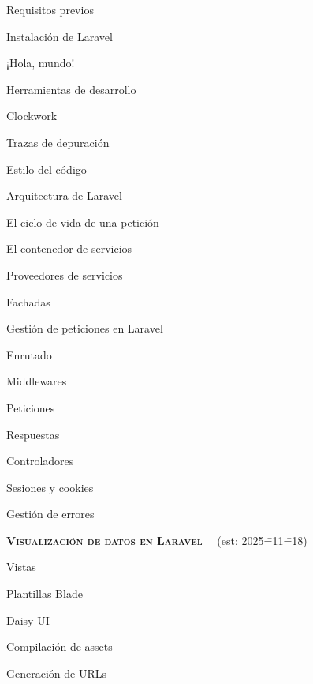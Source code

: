 \begin{longenum}
\begin{longenum}
        \begin{longenum}
            \item Requisitos previos
            \item Instalación de Laravel
        \end{longenum}
        \item ¡Hola, mundo!
        \item Herramientas de desarrollo
        \begin{longenum}
            \item Clockwork
            \item Trazas de depuración
        \end{longenum}
        \item Estilo del código
        \item Arquitectura de Laravel
        \begin{longenum}
            \item El ciclo de vida de una petición
            \item El contenedor de servicios
            \item Proveedores de servicios
            \item Fachadas
        \end{longenum}
        \item Gestión de peticiones en Laravel
        \begin{longenum}
            \item Enrutado
            \item Middlewares
            \item Peticiones
            \item Respuestas
            \item Controladores
            \item Sesiones y cookies
            \item Gestión de errores
        \end{longenum}
    \end{longenum}
    \item \textbf{\textsc{Visualización de datos en Laravel}} \ \ (est: 2025\==11\==18)
    \begin{longenum}
        \item Vistas
        \item Plantillas Blade
        \item Daisy UI
        \item Compilación de assets
        \item Generación de URLs

\end{longenum}
\end{longenum}
